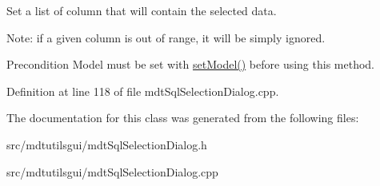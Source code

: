 Set a list of column that will contain the selected data. 

Note: if a given column is out of range, it will be simply ignored.

\begin{DoxyPrecond}{Precondition}
Model must be set with \hyperlink{classmdt_sql_selection_dialog_aabe0554b9ca3f4a8d37a79e812dd8770}{setModel()} before using this method. 
\end{DoxyPrecond}


Definition at line 118 of file mdtSqlSelectionDialog.cpp.



The documentation for this class was generated from the following files:\begin{DoxyCompactItemize}
\item 
src/mdtutilsgui/mdtSqlSelectionDialog.h\item 
src/mdtutilsgui/mdtSqlSelectionDialog.cpp\end{DoxyCompactItemize}
